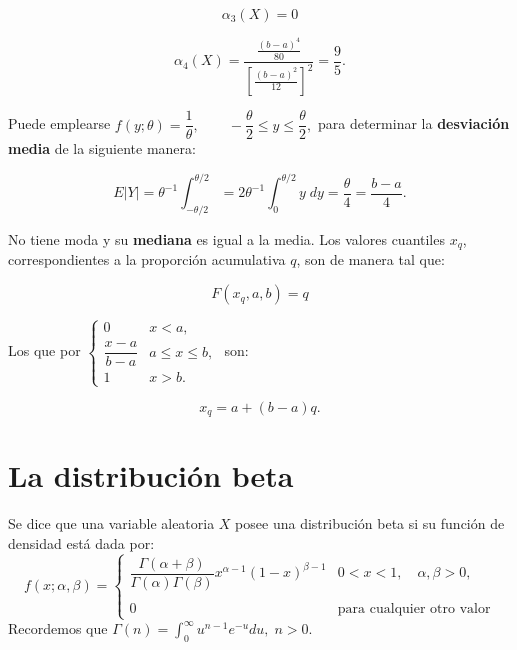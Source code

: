 \begin{tcolorbox}
    $$\alpha_3(X)=0$$
\end{tcolorbox}

\begin{tcolorbox}
    $$\alpha_4(X)=\dfrac{\frac{(b-a)^4}{80}}{\left[\frac{(b-a)^2}{12}\right]^2}=\dfrac{9}{5}.$$
\end{tcolorbox}

Puede emplearse $f(y;\theta)=\dfrac{1}{\theta},\qquad -\dfrac{\theta}{2}\leq y\leq \dfrac{\theta}{2},$ para determinar la \textbf{desviación media} de la siguiente manera:

\begin{tcolorbox}
    $$E|Y|=\theta^{-1}\int_{-\theta/2}^{\theta/2}=2\theta^{-1}\int_{0}^{\theta/2} y \; dy = \dfrac{\theta}{4}=\dfrac{b-a}{4}.$$
\end{tcolorbox}

No tiene moda y su \textbf{mediana} es igual a la media. Los valores cuantiles $x_q$, correspondientes a la proporción acumulativa $q$, son de manera tal que:
\begin{tcolorbox}
    $$F(x_q,a,b)=q$$
\end{tcolorbox}

Los que por $\left\{\begin{array}{ll}
	    0 & x<a,\\
	    \dfrac{x-a}{b-a} & a\leq x\leq b,\\
	    1 & x>b.
	\end{array}\right.$
son:

$$x_q=a+(b-a)q.$$

\section{La distribución beta}

\begin{tcolorbox}
    \begin{def.}
	Se dice que una variable aleatoria $X$ posee una distribución beta si su función de densidad está dada por:
	$$f(x;\alpha,\beta)=\left\{\begin{array}{ll}
		\dfrac{\Gamma(\alpha+\beta)}{\Gamma(\alpha)\Gamma(\beta)}x^{\alpha-1}(1-x)^{\beta-1} & 0<x<1,\quad \alpha,\beta >0,\\\\
		0&\mbox{para cualquier otro valor}
	     \end{array}\right.$$
	     Recordemos que $\Gamma(n)=\displaystyle\int_{0}^{\infty} u^{n-1}e^{-u} du,\; n>0$.
    \end{def.}
\end{tcolorbox}

